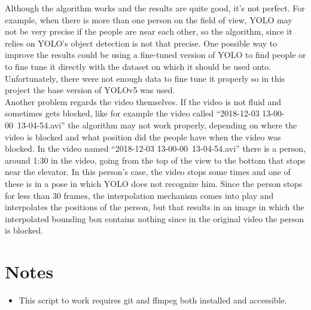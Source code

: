 \documentclass[conference]{IEEEtran}
\begin{document}
		Although the algorithm works and the results are quite good, it's not perfect. For example, when there is more than one person on the field of view,
		YOLO may not be very precise if the people are near each other, so the algorithm, since it relies on YOLO's object detection is not that precise. 
		One possible way to improve the results could be using a fine-tuned version of YOLO to find people or to fine tune it directly with the dataset on which 
		it should be used onto. Unfortunately, there were not enough data to fine tune it properly so in this project the base version of YOLOv5 was used.\\
		Another problem regards the video themselves. If the video is not fluid and sometimes gets blocked, like for example the video called ``2018-12-03 13-00-00~13-04-54.avi''
		the algorithm may not work properly, depending on where the video is blocked and what position did the people have when the video was blocked. In the 
		video named ``2018-12-03 13-00-00~13-04-54.avi'' there is a person, around 1:30 in the video, going from the top of the view to the bottom that stops 
		near the elevator. In this person's case, the video stops some times and one of these is in a pose in which YOLO does not recognize him. Since the person 
		stops for less than 30 frames, the interpolation mechanism comes into play and interpolates the positions of the person, but that results in an image 
		in which the interpolated bounding box contains nothing since in the original video the person is blocked.

	
	\section{Notes}
	
		\begin{itemize}
		
			\item This script to work requires git and ffmpeg both installed and accessible. 
		
		\end{itemize}
	
	\nocite{*}
	\printbibliography
\end{document}
